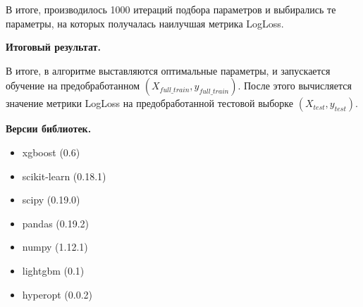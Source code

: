 \documentclass{article}
\begin{document}
В итоге, производилось 1000 итераций подбора параметров и выбирались те параметры, на которых получалась наилучшая метрика LogLoss.


\medskip
\noindent\textbf{Итоговый результат.}
\medskip

В итоге, в алгоритме выставляются оптимальные параметры, и запускается обучение на предобработанном $(X_{full\_train}, y_{full\_train})$. После этого вычисляется значение метрики LogLoss на предобработанной тестовой выборке $(X_{test}, y_{test})$.

\medskip
\noindent\textbf{Версии библиотек.}

\begin{itemize}
  \item xgboost (0.6)
  \item scikit-learn (0.18.1)
  \item scipy (0.19.0)
  \item pandas (0.19.2)
  \item numpy (1.12.1)
  \item lightgbm (0.1)
  \item hyperopt (0.0.2)
\end{itemize}
\end{document}
